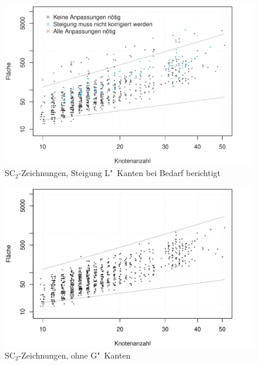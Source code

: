 \documentclass{beamer}
\begin{document}
\begin{frame}
\begin{figure}[h]
  \centering
  \includegraphics[width=.9\textwidth]{plots/area_smooth_bst}
  \caption{SC$_2$-Zeichnungen, Steigung L"~Kanten bei Bedarf berichtigt}
  \label{fig:smooth-opti}
\end{figure}
\end{frame}

\begin{frame}
\begin{figure}[h]
  \centering
  \includegraphics[width=.9\textwidth]{plots/area_smooth_noG}
  \caption{SC$_2$-Zeichnungen, ohne G"~Kanten}
  \label{fig:smooth-noG}
\end{figure}
\end{frame}

\end{document}
